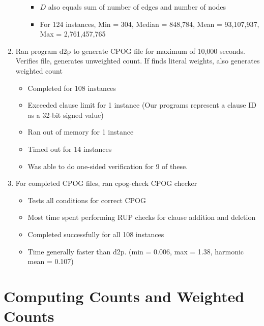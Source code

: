 \documentclass[letterpaper,USenglish,cleveref, autoref, thm-restate]{lipics-v2021}
\begin{document}
\begin{enumerate}
\begin{itemize}
\begin{itemize}
       \item $D$ also equals sum of number of edges and number of nodes
       \item For 124 instances, Min = 304, Median = 848,784, Mean = 93,107,937, Max = 2,761,457,765
       \end{itemize}
     \end{itemize}
   \item Ran program {\sc d2p} to generate CPOG file for maximum of
     10,000 seconds.  Verifies file, generates unweighted count. If
     finds literal weights, also generates weighted count
     \begin{itemize}
     \item Completed for 108 instances
     \item Exceeded clause limit for 1 instance (Our programs represent a clause ID as a 32-bit signed value)
     \item Ran out of memory for 1 instance
     \item Timed out for 14 instances
     \item Was able to do one-sided verification for 9 of these.
     \end{itemize}
   \item For completed CPOG files, ran {\sc cpog-check} CPOG checker
     \begin{itemize}
     \item Tests all conditions for correct CPOG
     \item Most time spent performing RUP checks for clause addition and deletion
     \item Completed successfully for all 108 instances
     \item Time generally faster than {\sc d2p}. (min = 0.006, max = 1.38, harmonic mean = 0.107)
     \end{itemize}
\end{enumerate}

\section*{Computing Counts and Weighted Counts}
\end{document}
